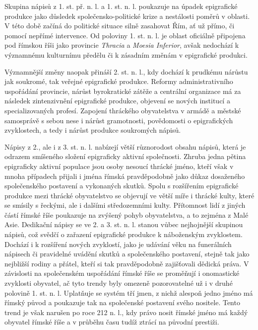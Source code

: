 Skupina nápisů z 1. st. př. n. l. a 1. st. n. l. poukazuje na úpadek epigrafické produkce jako důsledek společensko-politické krize a nestálosti poměrů v oblasti. V této době začíná do politické situace silně zasahovat Řím, ať už přímo, či pomocí nepřímé intervence. Od poloviny 1. st. n. l. je oblast oficiálně připojena pod římskou říši jako provincie {\em Thracia} a {\em Moesia Inferior}, avšak nedochází k významnému kulturnímu předělu či k zásadním změnám v epigrafické produkci.

Významnější změny naopak přináší 2. st. n. l., kdy dochází k prudkému nárůstu jak soukromé, tak veřejné epigrafické produkce. Reformy administrativního uspořádání provincie, nárůst byrokratické zátěže a centrální organizace má za následek zintenzivnění epigrafické produkce, objevení se nových institucí a specializovaných profesí. Zapojení thráckého obyvatelstva v armádě a městské samosprávě s sebou nese i nárůst gramotnosti, povědomosti o epigrafických zvyklostech, a tedy i nárůst produkce soukromých nápisů.

Nápisy z 2., ale i z 3. st. n. l. nabízejí větší různorodost obsahu nápisů, která je odrazem smíšeného složení epigraficky aktivní společnosti. Zhruba jedna pětina epigraficky aktivní populace jsou osoby nesoucí thrácké jméno, kteří však v mnoha případech přijali i jména římská pravděpodobně jako důkaz dosaženého společenského postavení a vykonaných skutků. Spolu s rozšířením epigrafické produkce mezi thrácké obyvatelstvo se objevují ve větší míře i thrácké kulty, které se smísily s řeckými, ale i dalšími středozemními kulty. Přítomnost lidí z jiných částí římské říše poukazuje na zvýšený pohyb obyvatelstva, a to zejména z Malé Asie. Dedikační nápisy se ve 2. a 3. st. n. l. stanou vůbec nejhojnější skupinou nápisů, což svědčí o zařazení epigrafické produkce k náboženským zvyklostem. Dochází i k rozšíření nových zvyklostí, jako je udávání věku na funerálních nápisech či pravidelné uvádění skutků a společenského postavení, stejně tak jako nejbližší rodiny a přátel, kteří si tak pravděpodobně zajišťovali dědická práva. V závislosti na společenském uspořádání římské říše se proměňují i onomastické zvyklosti obyvatel, ač tyto trendy byly omezeně pozorovatelné už i v druhé polovině 1. st. n. l. Uplatňuje se systém tří jmen, z nichž alespoň jedno jméno má římský původ a poukazuje tak na společenské postavení svého nositele. Tento trend je však narušen po roce 212 n. l., kdy právo nosit římské jméno má každý obyvatel římské říše a v průběhu času tudíž ztrácí na původní prestiži.

